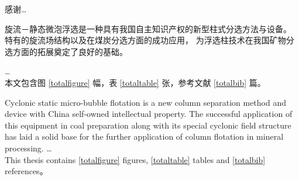 \begin{acknowledgements}
	感谢\dots \\

\end{acknowledgements}

\begin{cabstract}
	旋流－静态微泡浮选是一种具有我国自主知识产权的新型柱式分选方法与设备。
	特有的旋流场结构以及在煤炭分选方面的成功应用，
	为浮选柱技术在我国矿物分选方面的拓展奠定了良好的基础。


	\dots \\

	本文包含图 \ref{totalfigure} 幅，表 \ref{totaltable} 张，参考文献 \ref{totalbib} 篇。
\end{cabstract}

\begin{eabstract}
	Cyclonic static micro-bubble flotation is a new column separation method and device with China 
	self-owned intellectual property.  The successful application of this equipment in coal preparation 
	along with its special cyclonic field structure has laid a solid base for the further application of 
	column flotation in mineral processing.
	\dots \\


	This thesis contains \ref{totalfigure} figures, \ref{totaltable} tables and \ref{totalbib} references。
\end{eabstract}